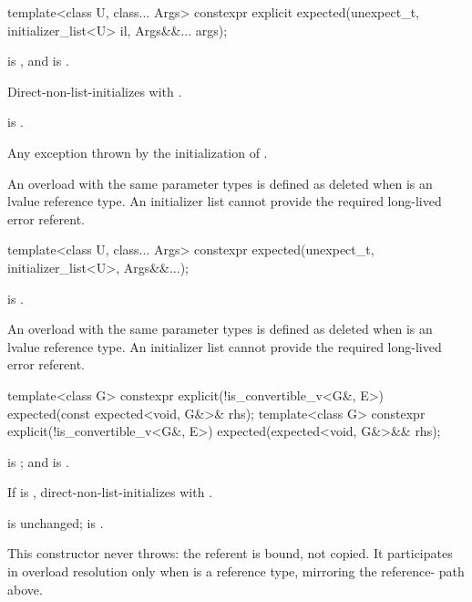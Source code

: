 %
\begin{itemdecl}
template<class U, class... Args>
constexpr explicit expected(unexpect_t, initializer_list<U> il, Args&&... args);
\end{itemdecl}

\begin{itemdescr}
\pnum
\constraints
{} is , and  is .

\pnum
\effects
Direct-non-list-initializes  with .

\pnum
\ensures
{} is .

\pnum
\throws
Any exception thrown by the initialization of .

\pnum
\remarks
An overload with the same parameter types is defined as deleted when  is an lvalue reference type. An initializer list cannot provide the required long-lived error referent.
\end{itemdescr}

%
\begin{itemdecl}
template<class U, class... Args>
constexpr expected(unexpect_t, initializer_list<U>, Args&&...);
\end{itemdecl}

\begin{itemdescr}
\pnum
\constraints
{} is .

\pnum
\remarks
An overload with the same parameter types is defined as deleted when  is an lvalue reference type. An initializer list cannot provide the required long-lived error referent.
\end{itemdescr}

%
\begin{itemdecl}
template<class G>
constexpr explicit(!is_convertible_v<G&, E>) expected(const expected<void, G&>& rhs);
template<class G>
constexpr explicit(!is_convertible_v<G&, E>) expected(expected<void, G&>&& rhs);
\end{itemdecl}

\begin{itemdescr}
\pnum
\constraints
{} is ; and  is .

\pnum
\effects
If  is , direct-non-list-initializes  with .

\pnum
\ensures
{} is unchanged;  is .

\pnum
\remarks
This constructor never throws: the referent is bound, not copied. It participates in overload resolution only when  is a reference type, mirroring the  reference- path above.
\end{itemdescr}

